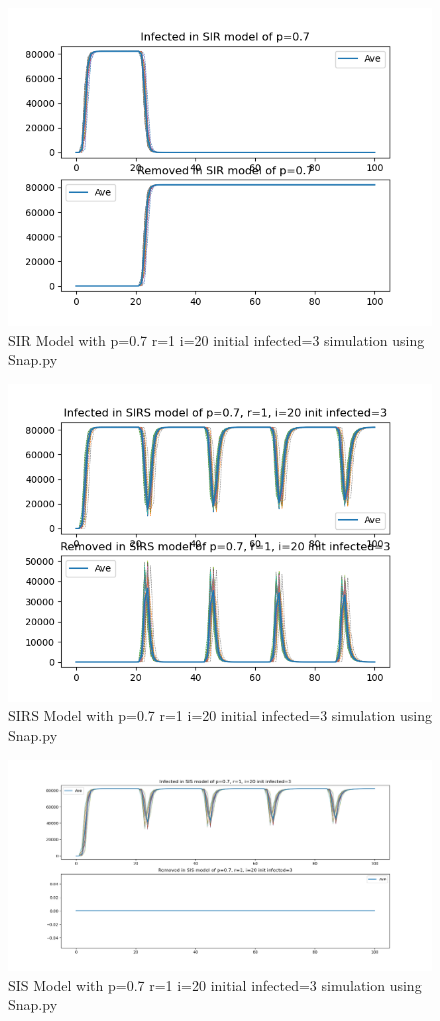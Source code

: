 \documentclass{subfile}
\begin{document}
  \begin{figure}
  \includegraphics[scale=0.8]{sirp07r1i20s3}
  \caption[SIR p=0.7,r=1,i=20,init infected=3]{SIR Model with p=0.7 r=1 i=20 initial infected=3 simulation using Snap.py}
  \end{figure}
  \begin{figure}
  \includegraphics[scale=0.8]{sirsp07r1i20s3}
  \caption[SIRS p=0.7,r=1,i=20,init infected=3]{SIRS Model with p=0.7 r=1 i=20 initial infected=3 simulation using Snap.py}
  \end{figure}
  \begin{figure}
  \includegraphics[scale=0.8]{sisp07r1i20s3}
  \caption[SIS p=0.7,r=1,i=20,init infected=3]{SIS Model with p=0.7 r=1 i=20 initial infected=3 simulation using Snap.py}
  \end{figure}

  \clearpage
\end{document}

